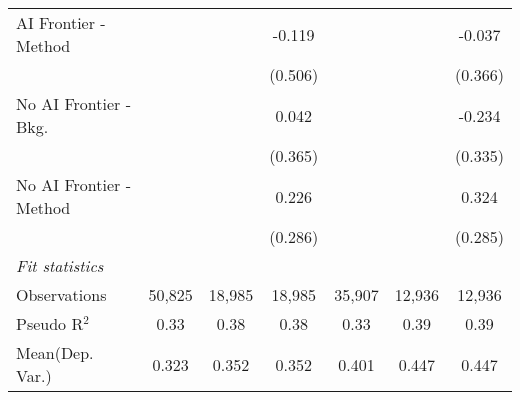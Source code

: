 \begin{tabular}{lcccccc}
   AI Frontier - Method    &               &               & -0.119        &               &               & -0.037\\   
                           &               &               & (0.506)       &               &               & (0.366)\\   
   No AI Frontier - Bkg.   &               &               & 0.042         &               &               & -0.234\\   
                           &               &               & (0.365)       &               &               & (0.335)\\   
   No AI Frontier - Method &               &               & 0.226         &               &               & 0.324\\   
                           &               &               & (0.286)       &               &               & (0.285)\\   
   \midrule
   \emph{Fit statistics}\\
   Observations            & 50,825        & 18,985        & 18,985        & 35,907        & 12,936        & 12,936\\  
   Pseudo R$^2$            & 0.33          & 0.38          & 0.38          & 0.33          & 0.39          & 0.39\\  
Mean(Dep. Var.) & 0.323 & 0.352 & 0.352 & 0.401 & 0.447 & 0.447 \\
   

\end{tabular}
